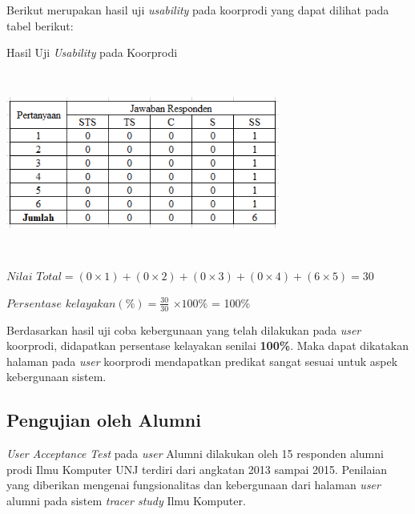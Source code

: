 \begin{enumerate}
	Berikut merupakan hasil uji \textit{usability} pada koorprodi yang dapat dilihat pada tabel berikut:
	
	\begin{table}[H]
		\centering
		\caption{Hasil Uji \textit{Usability} pada Koorprodi}
		\includegraphics[width=9cm,height=6cm]{gambar/UAT/hasil_u_koorprodi}
		\label{h_u_koorprodi}
	\end{table}
	
	$Nilai$ $Total = (0 \times 1) + (0 \times 2) + (0 \times 3) + (0 \times 4) + (6 \times 5) = 30$
	
	$Persentase$ $kelayakan (\%) = \frac{30}{30} $ $\times 100\%$ = 100\%

	Berdasarkan hasil uji coba kebergunaan yang telah dilakukan pada \textit{user} koorprodi, didapatkan persentase kelayakan senilai \textbf{100\%}. Maka dapat dikatakan halaman pada \textit{user} koorprodi mendapatkan predikat sangat sesuai untuk aspek kebergunaan sistem.
	
\end{enumerate}

\subsection{Pengujian oleh Alumni}
	\textit{User Acceptance Test} pada \textit{user} Alumni dilakukan oleh 15 responden alumni prodi Ilmu Komputer UNJ terdiri dari angkatan 2013 sampai 2015. Penilaian yang diberikan mengenai fungsionalitas dan kebergunaan dari halaman \textit{user} alumni pada sistem \textit{tracer study} Ilmu Komputer.


